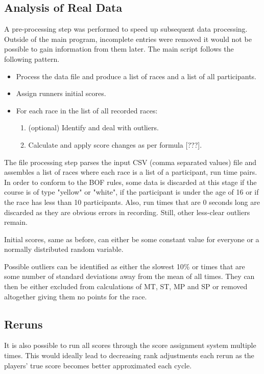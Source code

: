 \subsection{Analysis of Real Data}
A pre-processing step was performed to speed up subsequent data processing. Outside of the main program, incomplete entries were removed it would not be possible to gain information from them later.
The main script follows the following pattern.
\begin{itemize}
\item Process the data file and produce a list of races and a list of all participants.
\item Assign runners initial scores.
\item For each race in the list of all recorded races:
	\begin{enumerate}
	\item (optional) Identify and deal with outliers.
	\item Calculate and apply score changes as per formula [???].
	\end{enumerate}
\end{itemize}

The file processing step parses the input CSV (comma separated values) file and assembles a list of races where each race is a list of a participant, run time pairs. In order to conform to the BOF rules, some data is discarded at this stage if the course is of type "yellow" or "white", if the participant is under the age of 16 or if the race has less than 10 participants. Also, run times that are 0 seconds long are discarded as they are obvious errors in recording. Still, other less-clear outliers remain.

Initial scores, same as before, can either be some constant value for everyone or a normally distributed random variable.

Possible outliers can be identified as either the slowest 10\% or times that are some number of standard deviations away from the mean of all times. They can then be either excluded from calculations of MT, ST, MP and SP or removed altogether giving them no points for the race.

\subsection{Reruns}
It is also possible to run all scores through the score assignment system multiple times. This would ideally lead to decreasing rank adjustments each rerun as the players' true score becomes better approximated each cycle.  